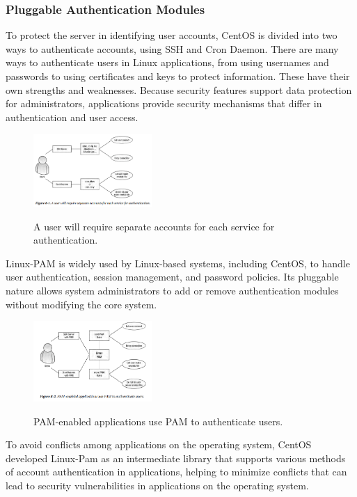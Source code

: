 \documentclass[10pt]{article}
\begin{document}
\subsubsection{Pluggable Authentication Modules}
To protect the server in identifying user accounts, CentOS is divided into two ways to authenticate accounts, using SSH and Cron Daemon.
\newline There are many ways to authenticate users in Linux applications, from using usernames and passwords to using certificates and keys to protect information. These have their own strengths and weaknesses. Because security features support data protection for administrators, applications provide security mechanisms that differ in authentication and user access.
\cite{FoCL}
\begin{figure}[!htbp]
    \centering
    \includegraphics[width=0.4\textwidth]{./research_example/Screenshot 2023-04-14 122628.png}
    \begin{description}
        \item[] 
    \end{description}
    \caption{A user will require separate accounts for each service for authentication.}
    \label{fig:description}
\end{figure}
\newline Linux-PAM is widely used by Linux-based systems, including CentOS, to handle user authentication, session management, and password policies. Its pluggable nature allows system administrators to add or remove authentication modules without modifying the core system.
\begin{figure}[!htbp]
    \centering
    \includegraphics[width=0.4\textwidth]{./research_example/Screenshot 2023-04-26 235210.png}
    \begin{description}
        \item[] 
    \end{description}
    \caption{PAM-enabled applications use PAM to authenticate users.}
    \label{fig:description}
\end{figure}
\newline To avoid conflicts among applications on the operating system, CentOS developed Linux-Pam as an intermediate library that supports various methods of account authentication in applications, helping to minimize conflicts that can lead to security vulnerabilities in applications on the operating system.
\cite{FoCL}
\end{document}
